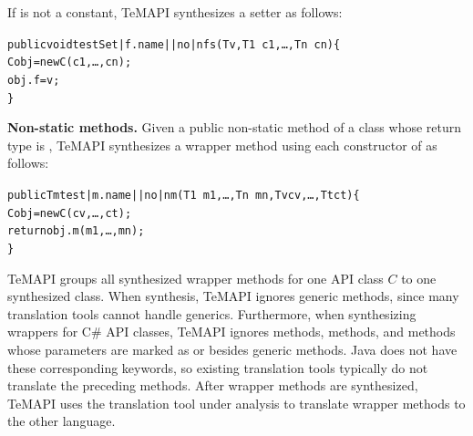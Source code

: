 If  is not a constant, TeMAPI synthesizes a setter as follows:

\begin{CodeOut}%
\begin{alltt}
 public void testSet|f.name||no|nfs(T v, T1\ c1,\ldots, Tn\ cn)\{
   C obj = new C(c1,\ldots, cn);
   obj.f = v;
 \}
\end{alltt}
\end{CodeOut}%

\textbf{Non-static methods.} Given a public non-static method  of a class  whose return type is , TeMAPI synthesizes a wrapper method using each constructor  of  as follows:

\begin{CodeOut}%
\begin{alltt}
 public Tm test|m.name||no|nm(T1\ m1,\ldots, Tn\ mn, Tv cv, \ldots, Tt ct)\{
   C obj = new C(cv,\ldots, ct);
   return obj.m(m1,\ldots, mn);
 \}
\end{alltt}
\end{CodeOut}%


TeMAPI groups all synthesized wrapper methods for one API class $C$ to one synthesized class. When synthesis, TeMAPI ignores generic methods, since many translation tools cannot handle generics. Furthermore, when synthesizing wrappers for C\# API classes, TeMAPI ignores  methods,  methods, and methods whose parameters are marked as  or  besides generic methods. Java does not have these corresponding keywords, so existing translation tools typically do not translate the preceding methods. After wrapper methods are synthesized, TeMAPI uses the translation tool under analysis to translate wrapper methods to the other language.

